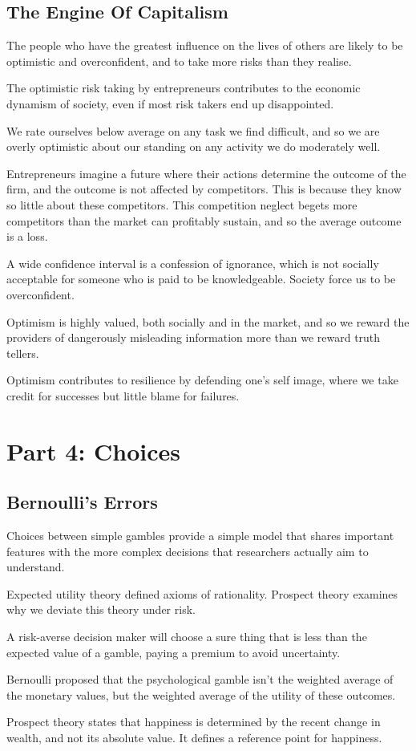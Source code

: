 \subsection*{The Engine Of Capitalism}

\bit
\item The people who have the greatest influence on the lives of others are likely to be optimistic and
overconfident, and to take more risks than they realise.
\item The optimistic risk taking by entrepreneurs contributes to the economic dynamism of society, even if most risk
takers end up disappointed.
\item We rate ourselves below average on any task we find difficult, and so we are overly optimistic about our
standing on any activity we do moderately well.
\item Entrepreneurs imagine a future where their actions determine the outcome of the firm, and the outcome is not
affected by competitors. This is because they know so little about these competitors. This competition neglect begets
more competitors than the market can profitably sustain, and so the average outcome is a loss.
\item A wide confidence interval is a confession of ignorance, which is not socially acceptable for someone who is
paid to be knowledgeable. Society force us to be overconfident.
\item Optimism is highly valued, both socially and in the market, and so we reward the providers of dangerously
misleading information more than we reward truth tellers.
\item Optimism contributes to resilience by defending one's self image, where we take credit for successes but little
blame for failures.
\eit

\section*{Part 4: Choices}

\subsection*{Bernoulli's Errors}

\bit
\item Choices between simple gambles provide a simple model that shares important features with the more complex
decisions that researchers actually aim to understand.
\item Expected utility theory defined axioms of rationality. Prospect theory examines why we deviate this theory
under risk.
\item A risk-averse decision maker will choose a sure thing that is less than the expected value of a gamble, paying
a premium to avoid uncertainty.
\item Bernoulli proposed that the psychological gamble isn't the weighted average of the monetary values, but the
weighted average of the utility of these outcomes.
\item Prospect theory states that happiness is determined by the recent change in wealth, and not its absolute value.
It defines a reference point for happiness.
\eit

